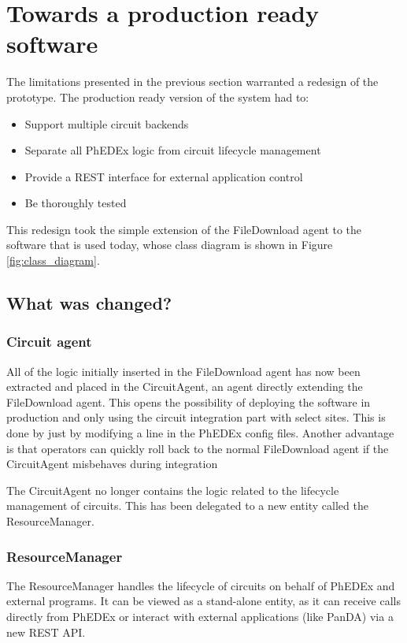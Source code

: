 \section{Towards a production ready software}

The limitations presented in the previous section warranted a redesign of the prototype.
The production ready version of the system had to:
\begin{itemize}
  \item Support multiple circuit backends
  \item Separate all PhEDEx logic from circuit lifecycle management
  \item Provide a REST interface for external application control
  \item Be thoroughly tested
\end{itemize}

This redesign took the simple extension of the FileDownload agent to the 
software that is used today, whose class diagram is shown in Figure \ref{fig:class_diagram}.

\subsection{What was changed?}

\subsubsection{Circuit agent}

All of the logic initially inserted in the FileDownload agent has now been extracted and 
placed in the CircuitAgent, an agent directly extending the FileDownload agent. This opens 
the possibility of deploying the software in production and only using the circuit integration 
part with select sites. This is done by just by modifying a line in the PhEDEx config files.
Another advantage is that operators can quickly roll back to the normal FileDownload agent 
if the CircuitAgent misbehaves during integration

The CircuitAgent no longer contains the logic related to the lifecycle management of circuits.
This has been delegated to a new entity called the ResourceManager.

\subsubsection{ResourceManager}

The ResourceManager handles the lifecycle of circuits on behalf of PhEDEx and external programs.
It can be viewed as a stand-alone entity, as it can receive calls directly from PhEDEx or 
interact with external applications (like PanDA\cite{PANDA}) via a new REST API.

